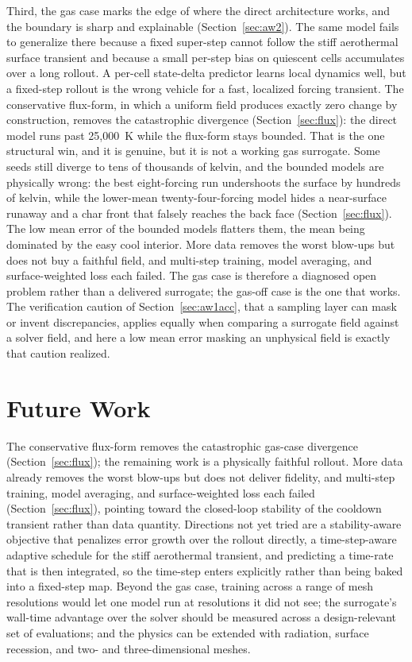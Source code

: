 \documentclass[conference]{IEEEtran}
\begin{document}
Third, the gas case marks the edge of where the direct architecture works, and the
boundary is sharp and explainable (Section~\ref{sec:aw2}). The same model fails to
generalize there because a fixed super-step cannot follow the stiff aerothermal
surface transient and because a small per-step bias on quiescent cells accumulates
over a long rollout. A per-cell state-delta predictor learns local dynamics well,
but a fixed-step rollout is the wrong vehicle for a fast, localized forcing
transient. The conservative flux-form, in which a uniform field produces exactly
zero change by construction, removes the catastrophic divergence
(Section~\ref{sec:flux}): the direct model runs past 25{,}000~K while the flux-form
stays bounded. That is the one structural win, and it is genuine, but it is not a
working gas surrogate. Some seeds still diverge to tens of thousands of kelvin,
and the bounded models are physically wrong: the best eight-forcing run
undershoots the surface by hundreds of kelvin, while the lower-mean
twenty-four-forcing model hides a near-surface runaway and a char front that
falsely reaches the back face (Section~\ref{sec:flux}). The low mean error of the
bounded models flatters them, the mean being dominated by the easy cool interior.
More data removes the worst blow-ups but does not buy a faithful field, and
multi-step training, model averaging, and surface-weighted loss each failed. The
gas case is therefore a diagnosed open problem rather than a delivered surrogate;
the gas-off case is the one that works. The verification caution of
Section~\ref{sec:aw1acc}, that a sampling layer can mask or invent discrepancies,
applies equally when comparing a surrogate field against a solver field, and here
a low mean error masking an unphysical field is exactly that caution realized.

\section{Future Work}
The conservative flux-form removes the catastrophic gas-case divergence
(Section~\ref{sec:flux}); the remaining work is a physically faithful rollout.
More data already removes the worst blow-ups but does not deliver fidelity, and
multi-step training, model averaging, and surface-weighted loss each failed
(Section~\ref{sec:flux}), pointing toward the closed-loop stability of the
cooldown transient rather than data quantity. Directions not yet tried are a
stability-aware objective that penalizes error growth over the rollout directly, a
time-step-aware adaptive schedule for the stiff aerothermal transient, and
predicting a time-rate that is then integrated, so the time-step enters explicitly
rather than being baked into a fixed-step map.
Beyond the gas case, training across a range of mesh resolutions would let one
model run at resolutions it did not see; the surrogate's wall-time advantage over
the solver should be measured across a design-relevant set of evaluations; and the
physics can be extended with radiation, surface recession, and two- and
three-dimensional meshes.
\end{document}
